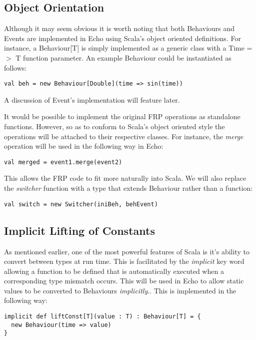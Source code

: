     \subsection{Object Orientation}
      Although it may seem obvious it is worth noting that both Behaviours and Events are implemented in
      Echo using Scala's object oriented definitions. For instance, a Behaviour[T] is simply
      implemented as a generic class with a Time =$>$ T function parameter. An example Behaviour
      could be instantiated as follows:
 
\begin{verbatim}
val beh = new Behaviour[Double](time => sin(time))
\end{verbatim}  

      A discussion of Event's implementation will feature later.
      
      It would be possible to implement the original FRP operations as standalone functions. However, so
      as to conform to Scala's object oriented style the operations will be attached to their respective
      classes. For instance, the \emph{merge} operation will be used in the following way in Echo:
      
\begin{verbatim}
val merged = event1.merge(event2)
\end{verbatim}

    This allows the FRP code to fit more naturally into Scala. We will also replace the \emph{switcher} function
    with a type that extends Behaviour rather than a function:
    
\begin{verbatim}
val switch = new Switcher(iniBeh, behEvent)
\end{verbatim}

    \subsection{Implicit Lifting of Constants}
      As mentioned earlier, one of the most powerful features of Scala is it's ability to convert between
      types at run time. This is facilitated by the \emph{implicit} key word allowing a function to be defined
      that is automatically executed when a corresponding type mismatch occurs. This will be used in Echo to allow 
      static values to be converted to Behaviours \emph{implicitly}.. This is implemented in the following way:  

\begin{verbatim}
implicit def liftConst[T](value : T) : Behaviour[T] = {
  new Behaviour(time => value)
}
\end{verbatim}              
      
